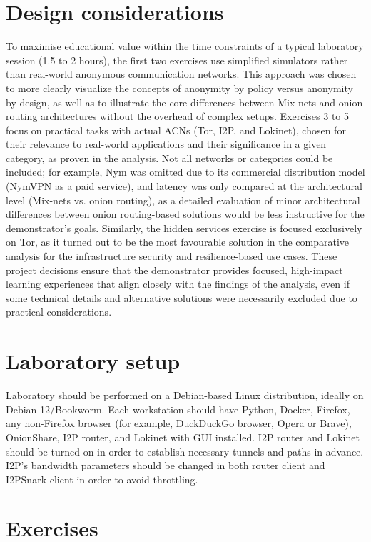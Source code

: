 \section{Design considerations}
To maximise educational value within the time constraints of a typical laboratory session (1.5 to 2 hours), the first two exercises use simplified simulators rather than real-world anonymous communication networks. This approach was chosen to more clearly visualize the concepts of anonymity by policy versus anonymity by design, as well as to illustrate the core differences between Mix-nets and onion routing architectures without the overhead of complex setups. Exercises 3 to 5 focus on practical tasks with actual ACNs (Tor, I2P, and Lokinet), chosen for their relevance to real-world applications and their significance in a given category, as proven in the analysis. Not all networks or categories could be included; for example, Nym was omitted due to its commercial distribution model (NymVPN as a paid service), and latency was only compared at the architectural level (Mix-nets vs. onion routing), as a detailed evaluation of minor architectural differences between onion routing-based solutions would be less instructive for the demonstrator’s goals. Similarly, the hidden services exercise is focused exclusively on Tor, as it turned out to be the most favourable solution in the comparative analysis for the infrastructure security and resilience-based use cases. These project decisions ensure that the demonstrator provides focused, high-impact learning experiences that align closely with the findings of the analysis, even if some technical details and alternative solutions were necessarily excluded due to practical considerations.

\section{Laboratory setup}
Laboratory should be performed on a Debian-based Linux distribution, ideally on Debian 12/Bookworm. Each workstation should have Python, Docker, Firefox, any non-Firefox browser (for example, DuckDuckGo browser, Opera or Brave), OnionShare, I2P router, and Lokinet with GUI installed. I2P router and Lokinet should be turned on in order to establish necessary tunnels and paths in advance. I2P's bandwidth parameters should be changed in both router client and I2PSnark client in order to avoid throttling.

\section{Exercises}

